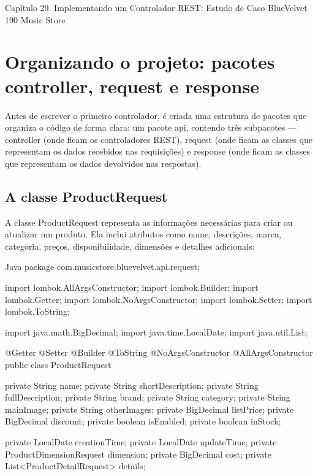 Capítulo 29. Implementando um Controlador REST: Estudo de Caso BlueVelvet 190 Music Store

\section{Organizando o projeto: pacotes controller, request e response}

Antes de escrever o primeiro controlador, é criada uma estrutura de pacotes que organiza o código de forma clara: um pacote api, contendo três subpacotes — controller (onde ficam os controladores REST), request (onde ficam as classes que representam os dados recebidos nas requisições) e response (onde ficam as classes que representam os dados devolvidos nas respostas).

\subsection{A classe ProductRequest}

A classe ProductRequest representa as informações necessárias para criar ou atualizar um produto. Ela inclui atributos como nome, descrições, marca, categoria, preços, disponibilidade, dimensões e detalhes adicionais:

\begin{codebox}{Java}
 package com.musicstore.bluevelvet.api.request;

 import lombok.AllArgsConstructor;
 import lombok.Builder;
 import lombok.Getter;
 import lombok.NoArgsConstructor;
 import lombok.Setter;
 import lombok.ToString;

 import java.math.BigDecimal;
 import java.time.LocalDate;
 import java.util.List;

 @Getter
 @Setter
 @Builder
 @ToString
 @NoArgsConstructor
 @AllArgsConstructor
 public class ProductRequest {

        private String name;
        private String shortDescription;
        private String fullDescription;
        private String brand;
        private String category;
        private String mainImage;
        private String otherImages;
        private BigDecimal listPrice;
        private BigDecimal discount;
        private boolean isEnabled;
        private boolean inStock;



       private LocalDate creationTime;
       private LocalDate updateTime;
       private ProductDimensionRequest dimension;
       private BigDecimal cost;
       private List<ProductDetailRequest> details;

}
\end{codebox}

